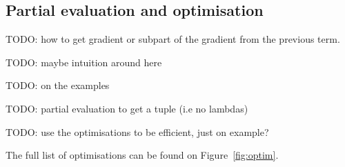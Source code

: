 

\subsection{Partial evaluation and optimisation} %
\label{sub:Partial evaluation and optimisation}

TODO: how to get gradient or subpart of the gradient from the previous term.

TODO: maybe intuition around here

TODO: on the examples

TODO: partial evaluation to get a tuple (i.e no lambdas)

TODO: use the optimisations to be efficient, just on example?

The full list of optimisations can be found on Figure~\ref{fig:optim}.